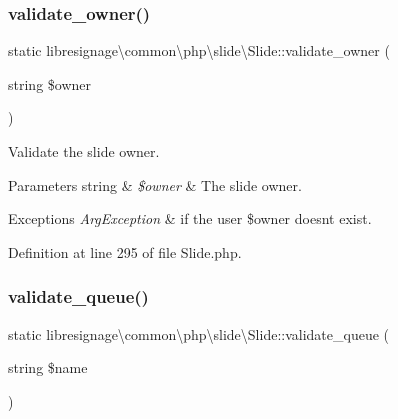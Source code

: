 \subsubsection{\texorpdfstring{validate\+\_\+owner()}{validate\_owner()}}
{\footnotesize\ttfamily static libresignage\textbackslash{}common\textbackslash{}php\textbackslash{}slide\textbackslash{}\+Slide\+::validate\+\_\+owner (\begin{DoxyParamCaption}\item[{string}]{\$owner }\end{DoxyParamCaption})\hspace{0.3cm}{\ttfamily [static]}}

Validate the slide owner.


\begin{DoxyParams}[1]{Parameters}
string & {\em \$owner} & The slide owner.\\
\hline
\end{DoxyParams}

\begin{DoxyExceptions}{Exceptions}
{\em Arg\+Exception} & if the user \$owner doesn\textquotesingle{}t exist. \\
\hline
\end{DoxyExceptions}


Definition at line 295 of file Slide.\+php.

\mbox{\label{classlibresignage_1_1common_1_1php_1_1slide_1_1Slide_a47e245fb24508ab3a69ba3571c601c33}} 
\subsubsection{\texorpdfstring{validate\+\_\+queue()}{validate\_queue()}}
{\footnotesize\ttfamily static libresignage\textbackslash{}common\textbackslash{}php\textbackslash{}slide\textbackslash{}\+Slide\+::validate\+\_\+queue (\begin{DoxyParamCaption}\item[{string}]{\$name }\end{DoxyParamCaption})\hspace{0.3cm}{\ttfamily [static]}}


